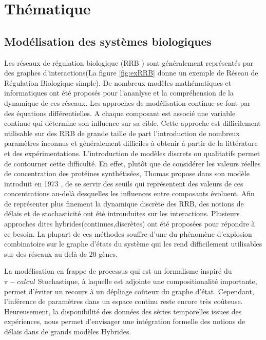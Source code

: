 
\chapter{Thématique}


\section{Modélisation des systèmes biologiques}\label{sec:model}
Les réseaux de régulation biologique (RRB \label{sec:RRB}) sont généralement représentés par des graphes d'interactions(La figure \ref{fig:exRRB} donne un exemple de Réseau de Régulation Biologique simple). 
De nombreux modèles mathématiques et informatiques ont été proposés
pour l'ananlyse et la compréhension de la dynamique de ces réseaux. Les approches de modélisation continue se font par des équations différentielles. A chaque composant est 
associé une variable continue qui détermine son influence sur sa cible. Cette approche est difficilement utilisable sur des RRB de grande taille de part l'introduction de nombreux 
paramètres inconnus et généralement difficiles à obtenir à partir de la littérature et des expérimentations. L'introduction de modèles discrets ou qualitatifs permet de contourner cette difficulté. En effet, plutôt que de considérer 
les valeurs réelles de concentration des protéines synthétisées, Thomas propose dans son modèle introduit en 1973 \cite{Thomas73}, de se servir des seuils qui représentent des 
valeurs de ces concentrations au-delà desquelles les influences entre composants évoluent. Afin de représenter plus finement la dynamique discrète des RRB, des notions de délais et de 
stochasticité ont été introuduites sur les interactions. Plusieurs approches dites hybrides(continues,discrètes) ont été proposées pour répondre à ce besoin. La plupart de ces méthodes souffre d'une 
du phénomène d'explosion combinatoire sur le graphe d'états du système qui les rend difficilement utilisables sur des réseaux au delà de $20$ gènes.

La modélisation en frappe de processus \cite{PMR10-TCSB,PaulevePhD} qui est un formalisme inspiré du $\pi-calcul$ Stochastique, à laquelle est adjointe une compositionalité importante, permet
d'éviter un recours à un dépliage coûteux du graphe d'état. Cependant, l'inférence de paramètres dans un espace continu reste encore très coûteuse. Heureusement, la disponibilité 
des données des séries temporelles issues des expériences, nous permet d'envisager une intégration formelle des notions de délais dans de grands modèles Hybrides. 

